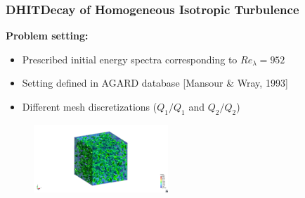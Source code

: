 \begin{frame}
  \frametitle{DHIT{\small Decay of Homogeneous Isotropic Turbulence}}
  \textbf{Problem setting:}
  \begin{itemize}
  \itemsep0cm
  \item Prescribed initial energy spectra corresponding to $Re_{\lambda}=952$
  \item Setting defined in AGARD database [Mansour \& Wray, 1993]
  \item Different mesh discretizations ($ Q_1/Q_1 $ and $ Q_2/Q_2 $)
  \end{itemize}
  \vspace{-0.1cm}
  \begin{figure}
      \centering	
      \includegraphics[clip=true,trim=19cm 2cm 19cm 3cm,width=0.45\textwidth]{Figures/iso_vorti_1.jpg}
  \end{figure}
\end{frame}
